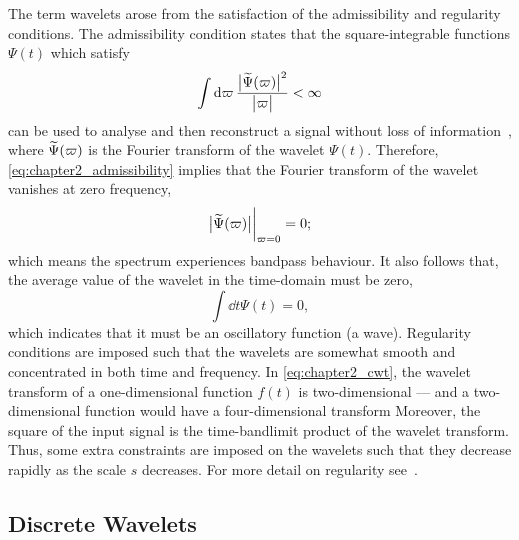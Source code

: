 The term wavelets arose from the satisfaction of the admissibility and regularity conditions.
The admissibility condition states that the square-integrable functions \(\Psi(t)\) which satisfy
%
\begin{equation}\label{eq:chapter2_admissibility}
	\int\dd{\varpi} \frac{\big\lvert\widetilde{\Psi}(\varpi)\big\rvert^{2}}{\big\lvert\varpi\big\rvert}
	< \infty
\end{equation}
%
can be used to analyse and then reconstruct a signal without loss of information~\cite{Sheng2010}, where \(\widetilde{\Psi}(\varpi)\) is the Fourier transform of the wavelet \(\Psi(t)\).
Therefore, \cref{eq:chapter2_admissibility} implies that the Fourier transform of the wavelet vanishes at zero frequency, \ie{}
%
\begin{equation}
	\big\lvert\widetilde{\Psi}(\varpi)\big\rvert \bigg\rvert_{\varpi=0}
	= 0;
\end{equation}
%
which means the spectrum experiences bandpass behaviour.
It also follows that, the average value of the wavelet in the time-domain must be zero, \ie{}
%
\begin{equation}
	\int\dd{t} \Psi(t)
	= 0,
\end{equation}
%
which indicates that it must be an oscillatory function (a wave).
Regularity conditions are imposed such that the wavelets are somewhat smooth and concentrated in both time and frequency.
In \cref{eq:chapter2_cwt}, the wavelet transform of a one-dimensional function \(f(t)\) is two-dimensional --- and a two-dimensional function would have a four-dimensional transform \etc{}
Moreover, the square of the input signal is the time-bandlimit product of the wavelet transform.
Thus, some extra constraints are imposed on the wavelets such that they decrease rapidly as the scale \(s\) decreases.
For more detail on regularity see~\cite{Burrus1997,Daubechies1992}.

\subsection{Discrete Wavelets}\label{sec:chapter2_discrete_wavelets}

